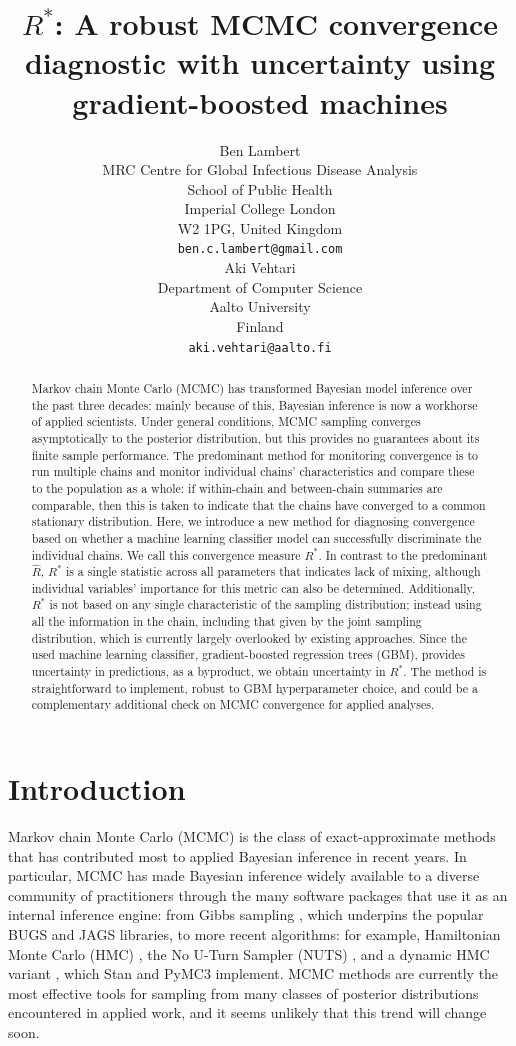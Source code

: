 \documentclass{article}
\title{$R^*$: A robust MCMC convergence diagnostic with uncertainty using gradient-boosted machines}
\author{%
	 Ben Lambert\\
	 MRC Centre for Global Infectious Disease Analysis\\
	 School of Public Health\\
	 Imperial College London\\
	 W2 1PG, United Kingdom\\
	 \texttt{ben.c.lambert@gmail.com} \\
	 \And
	 Aki Vehtari \\
	 Department of Computer Science\\
	 Aalto University\\
	 Finland\\
	 \texttt{aki.vehtari@aalto.fi}
}
\begin{document}

\maketitle

\begin{abstract}
  Markov chain Monte Carlo (MCMC) has transformed Bayesian model inference over the past three decades: mainly because of this, Bayesian inference is now a workhorse of applied scientists. Under general conditions, MCMC sampling converges asymptotically to the posterior distribution, but this provides no guarantees about its finite sample performance. The predominant method for monitoring convergence is to run multiple chains and monitor individual chains' characteristics and compare these to the population as a whole: if within-chain and between-chain summaries are comparable, then this is taken to indicate that the chains have converged to a common stationary distribution. Here, we introduce a new method for diagnosing convergence based on whether a machine learning classifier model can successfully discriminate the individual chains. We call this convergence measure $R^*$. In contrast to the predominant $\widehat{R}$, $R^*$ is a single statistic across all parameters that indicates lack of mixing, although individual variables' importance for this metric can also be determined. Additionally, $R^*$ is not based on any single characteristic of the sampling distribution; instead using all the information in the chain, including that given by the joint sampling distribution, which is currently largely overlooked by existing approaches. Since the used machine learning classifier, gradient-boosted regression trees (GBM), provides uncertainty in predictions, as a byproduct, we obtain uncertainty in $R^*$. The method is straightforward to implement, robust to GBM hyperparameter choice, and could be a complementary additional check on MCMC convergence for applied analyses.
\end{abstract}

\section{Introduction}
Markov chain Monte Carlo (MCMC) is the class of exact-approximate methods that has contributed most to applied Bayesian inference in recent years. In particular, MCMC has made Bayesian inference widely available to a diverse community of practitioners through the many software packages that use it as an internal inference engine: from Gibbs sampling \citep{geman1984stochastic}, which underpins the popular BUGS \citep{lunn2000winbugs} and JAGS \citep{plummer2003jags} libraries, to more recent algorithms: for example, Hamiltonian Monte Carlo (HMC) \citep{neal2011mcmc}, the No U-Turn Sampler (NUTS) \citep{hoffman2014no}, and a dynamic HMC variant \citep{betancourt2017conceptual}, which Stan \citep{carpenter2017stan} and PyMC3 \citep{salvatier2016probabilistic} implement. MCMC methods are currently the most effective tools for sampling from many classes of posterior distributions encountered in applied work, and it seems unlikely that this trend will change soon.
\end{document}
